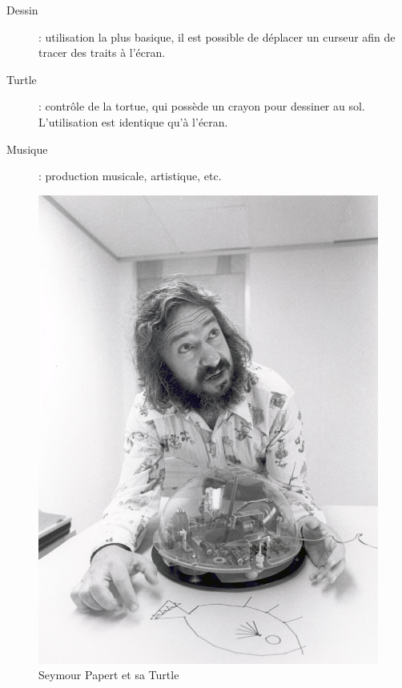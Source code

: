 \begin{minipage}[H]{0.5\linewidth}
  \begin{description}
    \item[Dessin] : utilisation la plus basique, il est possible de déplacer un curseur afin de tracer des traits à l'écran.
    \item[Turtle] : contrôle de la tortue, qui possède un crayon pour dessiner au sol. L'utilisation est identique qu'à l'écran.
    \item[Musique] : production musicale, artistique, etc.
  \end{description}
\end{minipage}
\begin{minipage}[H]{0.5\linewidth}
  \begin{figure}[H]
  \flushright
  \includegraphics[width=.9\textwidth]{../resources/illustrations/logo_turtle_1}
  \caption{Seymour Papert et sa Turtle}
  \end{figure}
\end{minipage}

